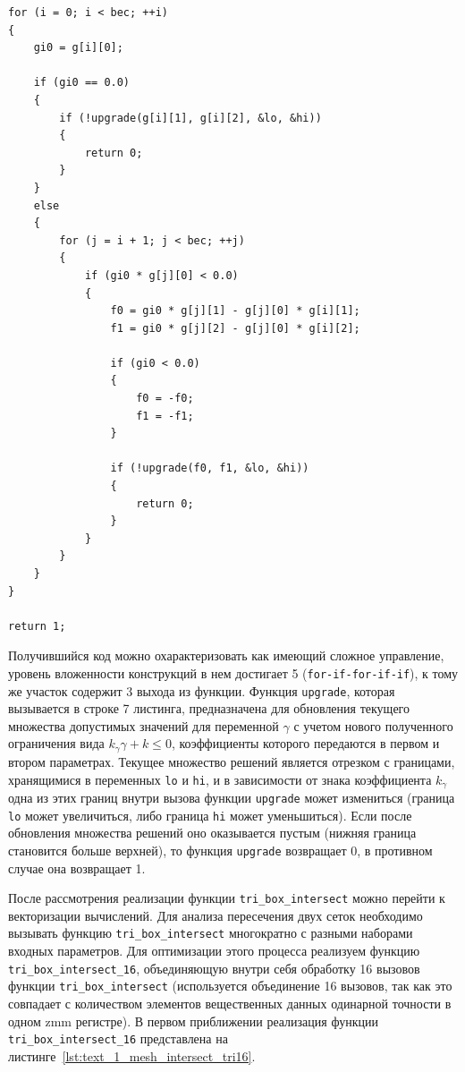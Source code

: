 \begin{lstlisting}[caption={Исходная реализация свертывания системы линейных неравенств для определения пересечения треугольника и прямоугольного параллелепипеда.},label={lst:text_1_mesh_intersect_tri}]
for (i = 0; i < bec; ++i)
{
    gi0 = g[i][0];

    if (gi0 == 0.0)
    {
        if (!upgrade(g[i][1], g[i][2], &lo, &hi))
        {
            return 0;
        }
    }
    else
    {
        for (j = i + 1; j < bec; ++j)
        {
            if (gi0 * g[j][0] < 0.0)
            {
                f0 = gi0 * g[j][1] - g[j][0] * g[i][1];
                f1 = gi0 * g[j][2] - g[j][0] * g[i][2];

                if (gi0 < 0.0)
                {
                    f0 = -f0;
                    f1 = -f1;
                }

                if (!upgrade(f0, f1, &lo, &hi))
                {
                    return 0;
                }
            }
        }
    }
}

return 1;
\end{lstlisting}

Получившийся код можно охарактеризовать как имеющий сложное управление, уровень вложенности конструкций в нем достигает 5 (\texttt{for-if-for-if-if}), к тому же участок содержит 3 выхода из функции.
Функция \texttt{upgrade}, которая вызывается в строке 7 листинга, предназначена для обновления текущего множества допустимых значений для переменной $\gamma$ с учетом нового полученного ограничения вида $k_{\gamma} \gamma + k \le 0$, коэффициенты которого передаются в первом и втором параметрах.
Текущее множество решений является отрезком с границами, хранящимися в переменных \texttt{lo} и \texttt{hi}, и в зависимости от знака коэффициента $k_{\gamma}$ одна из этих границ внутри вызова функции \texttt{upgrade} может измениться (граница \texttt{lo} может увеличиться, либо граница \texttt{hi} может уменьшиться).
Если после обновления множества решений оно оказывается пустым (нижняя граница становится больше верхней), то функция \texttt{upgrade} возвращает 0, в противном случае она возвращает 1.

После рассмотрения реализации функции \texttt{tri\_box\_intersect} можно перейти к векторизации вычислений.
Для анализа пересечения двух сеток необходимо вызывать функцию \texttt{tri\_box\_intersect} многократно с разными наборами входных параметров.
Для оптимизации этого процесса реализуем функцию \texttt{tri\_box\_intersect\_16}, объединяющую внутри себя обработку 16 вызовов функции \texttt{tri\_box\_intersect} (используется объединение 16 вызовов, так как это совпадает с количеством элементов вещественных данных одинарной точности в одном zmm регистре).
В первом приближении реализация функции \texttt{tri\_box\_intersect\_16} представлена на листинге~\ref{lst:text_1_mesh_intersect_tri16}.

